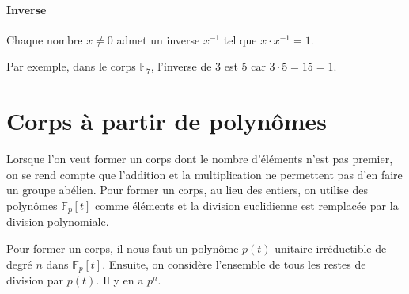 \documentclass[10pt,a4paper]{book}
\newcommand{\F}{\mathbb{F}}
\begin{document}
\paragraph{Inverse}
Chaque nombre $x\neq 0$ admet un inverse $x^{-1}$ tel que $x\cdot x^{-1}=1$.\par
Par exemple, dans le corps $\F_7$, l'inverse de 3 est 5 car $3\cdot 5=15=1$.

\section{Corps à partir de polynômes}
Lorsque l'on veut former un corps dont le nombre d'éléments n'est pas premier, on se rend compte que l'addition et la multiplication ne permettent pas d'en faire un groupe abélien. Pour former un corps, au lieu des entiers, on utilise des polynômes $\F_p[t]$ comme éléments et la division euclidienne est remplacée par la division polynomiale.\par 
Pour former un corps, il nous faut un polynôme $p(t)$ unitaire irréductible de degré $n$ dans $\F_p[t]$. Ensuite, on considère l'ensemble de tous les restes de division par $p(t)$. Il y en a $p^n$.
\end{document}
